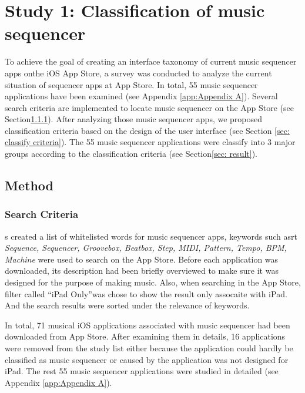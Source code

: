 \pagestyle{fancy}
\rhead{\thepage}
\chapter{Study 1: Classification of music sequencer}
\label{ch: chapter 3}

To achieve the goal of creating an interface taxonomy of current music sequencer apps onthe iOS App Store, a survey was conducted to analyze the current situation of sequencer apps at App Store. In total, 55 music sequencer applications have been examined (see Appendix \ref{app:Appendix A}). Several search criteria are implemented to locate music sequencer on the App Store (see Section\ref{subsec: search criteria}). After analyzing those music sequencer apps, we proposed classification criteria based on the design of the user interface (see Section \ref{sec: classify criteria}). The 55 music sequencer applications were classify into 3 major groups according to the classification criteria (see Section\ref{sec: result}).

\section{Method}
\label{sec:method}

\subsection{Search Criteria}
\label{subsec: search criteria}

\citeauthor{Reference13}\textquotesingle s created a list of whitelisted words for music sequencer apps, keywords such asrt \textit{Sequence, Sequencer, Groovebox, Beatbox, Step, MIDI, Pattern, Tempo, BPM, Machine} were used to search on the App Store. Before each application was downloaded, it\textquotesingle s description had been briefly overviewed to make sure it was designed for the purpose of making music.
Also, when searching in the App Store, filter called \textquotedblleft{iPad Only}\textquotedblright was chose to show the result only assocaite with iPad. And the search results were sorted under the relevance of keywords.

In total, 71 musical iOS applications associated with music sequencer had been downloaded from App Store. After examining them in details, 16 applications were removed from the study list either because the application could hardly be classified as music sequencer or caused by the application was not designed for iPad. The rest 55 music sequencer applications were studied in detailed (see Appendix \ref{app:Appendix A}).

